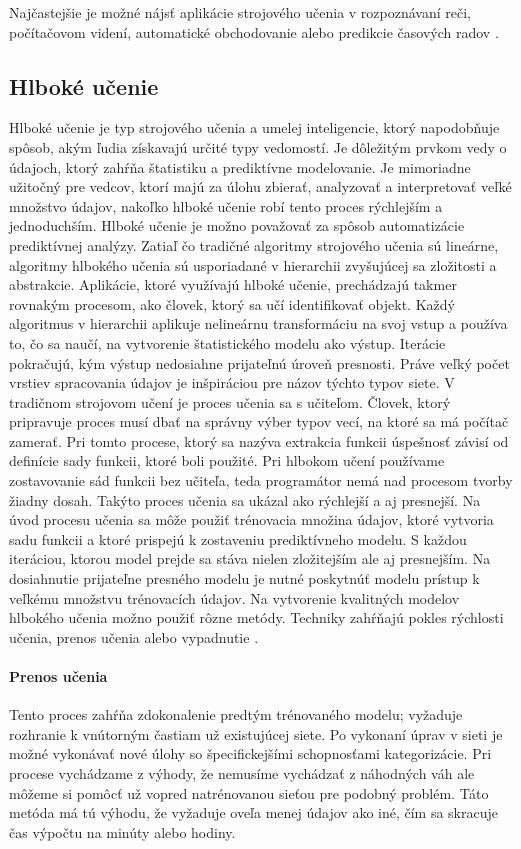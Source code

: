 Najčastejšie je možné nájsť aplikácie strojového učenia v rozpoznávaní reči, počítačovom videní, automatické obchodovanie alebo predikcie časových radov \cite{ai2}.

\subsection{Hlboké učenie}
Hlboké učenie je typ strojového učenia a umelej inteligencie, ktorý napodobňuje spôsob, akým ľudia získavajú určité typy vedomostí. Je dôležitým prvkom vedy o údajoch, ktorý zahŕňa štatistiku a prediktívne modelovanie. Je mimoriadne užitočný pre vedcov, ktorí majú za úlohu zbierať, analyzovať a interpretovať veľké množstvo údajov, nakoľko hlboké učenie robí tento proces rýchlejším a jednoduchším.
Hlboké učenie je možno považovať za spôsob automatizácie prediktívnej analýzy. Zatiaľ čo tradičné algoritmy strojového učenia sú lineárne, algoritmy hlbokého učenia sú usporiadané v hierarchii zvyšujúcej sa zložitosti a abstrakcie.
Aplikácie, ktoré využívajú hlboké učenie, prechádzajú takmer rovnakým procesom, ako človek, ktorý sa učí identifikovať objekt. Každý algoritmus v hierarchii aplikuje nelineárnu transformáciu na svoj vstup a používa to, čo sa naučí, na vytvorenie štatistického modelu ako výstup. Iterácie pokračujú, kým výstup nedosiahne prijateľnú úroveň presnosti. Práve veľký počet vrstiev spracovania údajov je inšpiráciou pre názov týchto typov siete.
V tradičnom strojovom učení je proces učenia sa s učiteľom. Človek, ktorý pripravuje proces musí dbať na správny výber typov vecí, na ktoré sa má počítač zamerať. Pri tomto procese, ktorý sa nazýva extrakcia funkcii úspešnosť závisí od definície sady funkcii, ktoré boli použité. Pri hlbokom učení používame zostavovanie sád funkcii bez učiteľa, teda programátor nemá nad procesom tvorby žiadny dosah. Takýto proces učenia sa ukázal ako rýchlejší a aj presnejší.
Na úvod procesu učenia sa môže použiť trénovacia množina údajov, ktoré vytvoria sadu funkcii a ktoré prispejú k zostaveniu prediktívneho modelu. S každou iteráciou, ktorou model prejde sa stáva nielen zložitejším ale aj presnejším. Na dosiahnutie prijateľne presného modelu je nutné poskytnúť modelu prístup k veľkému množstvu trénovacích údajov.
Na vytvorenie kvalitných modelov hlbokého učenia možno použiť rôzne metódy. Techniky zahŕňajú pokles rýchlosti učenia, prenos učenia alebo vypadnutie \cite{deep_learning}.
\paragraph{Prenos učenia} Tento proces zahŕňa zdokonalenie predtým trénovaného modelu; vyžaduje rozhranie k vnútorným častiam už existujúcej siete. Po vykonaní úprav v sieti je možné vykonávať nové úlohy so špecifickejšími schopnosťami kategorizácie. Pri procese vychádzame z výhody, že nemusíme vychádzať z náhodných váh ale môžeme si pomôcť už vopred natrénovanou sieťou pre podobný problém. Táto metóda má tú výhodu, že vyžaduje oveľa menej údajov ako iné, čím sa skracuje čas výpočtu na minúty alebo hodiny.



